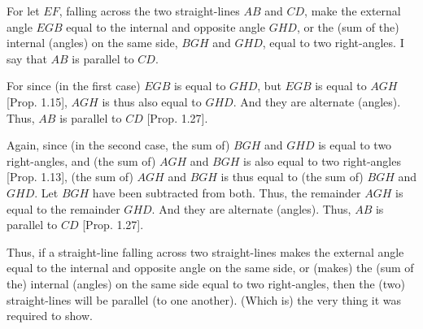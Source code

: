 \begin{Parallel}{}{}
{\epsfysize=2.2in
\centerline{}

For let $EF$, falling across the two straight-lines $AB$ and $CD$, make the external
angle $EGB$ equal to the internal and opposite angle $GHD$, or the (sum of the) internal
(angles) on the same side, $BGH$ and $GHD$, equal to two right-angles.
I say that $AB$ is parallel to $CD$.

For since (in the first case) $EGB$ is equal to $GHD$, but $EGB$ is equal to $AGH$ [Prop. 1.15],
$AGH$ is thus also equal to $GHD$. And they are alternate (angles).
Thus, $AB$ is
 parallel to $CD$ [Prop. 1.27].
 
Again, since (in the second case, the sum of) $BGH$ and $GHD$ is equal to two right-angles,  and (the sum of) $AGH$ and
$BGH$ is also equal to two right-angles [Prop. 1.13], 
(the sum of) $AGH$ and $BGH$ is thus equal to (the sum of) $BGH$ and $GHD$. Let $BGH$ have been
subtracted from both. Thus, the remainder $AGH$ is equal to the remainder
$GHD$. And they are alternate (angles). Thus, $AB$ is parallel
to $CD$ [Prop. 1.27].

Thus, if a straight-line falling across  two straight-lines makes the external angle equal
to the internal and opposite angle on the same side, or (makes) the (sum of the) internal
(angles) on the same side equal
to two right-angles, then the (two) straight-lines will be parallel (to
one another). (Which is) the very thing it was required to show.}
\end{Parallel}

